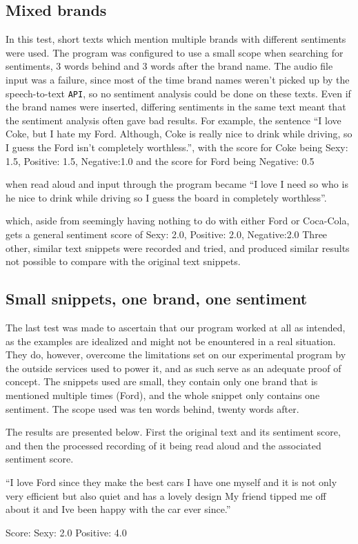 \documentclass[a4paper,12pt,twoside]{ltxdoc}
\begin{document}
\subsection{Mixed brands}
In this test, short texts which mention multiple brands with different sentiments were used. The program was configured to use a small scope when searching for sentiments, 3 words behind and 3 words after the brand name. The audio file input was a failure, since most of the time brand names weren't picked up by the speech-to-text \verb#API#, so no sentiment analysis could be done on these texts. Even if the brand names were inserted, differing sentiments in the same text meant that the sentiment analysis often gave bad results. For example, the sentence ``I love Coke, but I hate my Ford. Although, Coke is really nice to drink while driving, so I guess the Ford isn't completely worthless.'', with the score for Coke being 
Sexy: 1.5, Positive: 1.5, Negative:1.0
and the score for Ford being
Negative: 0.5

when read aloud and input through the program became ``I love I need so who is he nice to drink while driving so I guess the board in completely worthless''.

which, aside from seemingly having nothing to do with either Ford or Coca-Cola, gets a general sentiment score of 
Sexy: 2.0, Positive: 2.0, Negative:2.0
Three other, similar text snippets were recorded and tried, and produced similar results not possible to compare with the original text snippets.

\subsection{Small snippets, one brand, one sentiment}
The last test was made to ascertain that our program worked at all as intended, as the examples are idealized and might not be enountered in a real situation. They do, however, overcome the limitations set on our experimental program by the outside services used to power it, and as such serve as an adequate proof of concept. The snippets used are small, they contain only one brand that is mentioned multiple times (Ford), and the whole snippet only contains one sentiment. The scope used was ten words behind, twenty words after.

The results are presented below. First the original text and its sentiment score, and then the processed recording of it being read aloud and the associated sentiment score.

\begin{center}
``I love Ford since they make the best cars I have one myself and it is not only very efficient but also quiet and has a lovely design My friend tipped me off about it and Ive been happy with the car ever since.''
\end{center}
\hfill Score: Sexy: 2.0 Positive: 4.0
\end{document}
